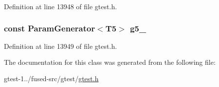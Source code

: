 \-Definition at line 13948 of file gtest.\-h.

\hypertarget{classtesting_1_1internal_1_1CartesianProductGenerator5_a938d8dc16afe9878a43d89ce3cd87ad7}{
\subsubsection[{g5\-\_\-}]{\setlength{\rightskip}{0pt plus 5cm}const {\bf \-Param\-Generator}$<$\-T5$>$ {\bf g5\-\_\-}}}\label{db/d7f/classtesting_1_1internal_1_1CartesianProductGenerator5_a938d8dc16afe9878a43d89ce3cd87ad7}


\-Definition at line 13949 of file gtest.\-h.



\-The documentation for this class was generated from the following file\-:\begin{DoxyCompactItemize}
\item 
gtest-\/1../fused-\/src/gtest/\hyperlink{fused-src_2gtest_2gtest_8h}{gtest.\-h}\end{DoxyCompactItemize}
